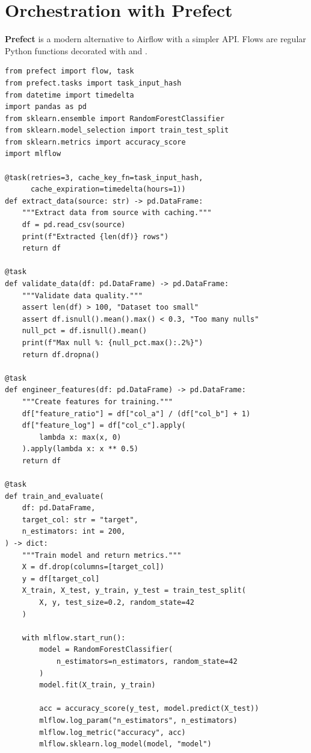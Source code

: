 \section{Orchestration with Prefect}
\label{sec:prefect}

\textbf{Prefect} is a modern alternative to Airflow with a
simpler API. Flows are regular Python functions decorated with
 and .

\begin{codeblock}[title=\textbf{Complete Prefect ML pipeline}]
\begin{verbatim}
from prefect import flow, task
from prefect.tasks import task_input_hash
from datetime import timedelta
import pandas as pd
from sklearn.ensemble import RandomForestClassifier
from sklearn.model_selection import train_test_split
from sklearn.metrics import accuracy_score
import mlflow

@task(retries=3, cache_key_fn=task_input_hash,
      cache_expiration=timedelta(hours=1))
def extract_data(source: str) -> pd.DataFrame:
    """Extract data from source with caching."""
    df = pd.read_csv(source)
    print(f"Extracted {len(df)} rows")
    return df

@task
def validate_data(df: pd.DataFrame) -> pd.DataFrame:
    """Validate data quality."""
    assert len(df) > 100, "Dataset too small"
    assert df.isnull().mean().max() < 0.3, "Too many nulls"
    null_pct = df.isnull().mean()
    print(f"Max null %: {null_pct.max():.2%}")
    return df.dropna()

@task
def engineer_features(df: pd.DataFrame) -> pd.DataFrame:
    """Create features for training."""
    df["feature_ratio"] = df["col_a"] / (df["col_b"] + 1)
    df["feature_log"] = df["col_c"].apply(
        lambda x: max(x, 0)
    ).apply(lambda x: x ** 0.5)
    return df

@task
def train_and_evaluate(
    df: pd.DataFrame,
    target_col: str = "target",
    n_estimators: int = 200,
) -> dict:
    """Train model and return metrics."""
    X = df.drop(columns=[target_col])
    y = df[target_col]
    X_train, X_test, y_train, y_test = train_test_split(
        X, y, test_size=0.2, random_state=42
    )

    with mlflow.start_run():
        model = RandomForestClassifier(
            n_estimators=n_estimators, random_state=42
        )
        model.fit(X_train, y_train)

        acc = accuracy_score(y_test, model.predict(X_test))
        mlflow.log_param("n_estimators", n_estimators)
        mlflow.log_metric("accuracy", acc)
        mlflow.sklearn.log_model(model, "model")


\end{verbatim}
\end{codeblock}
